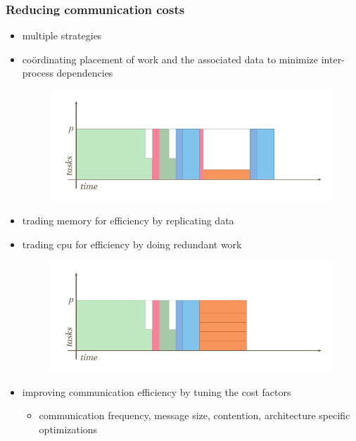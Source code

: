 \begin{frame}[fragile]
%
  \frametitle{Reducing communication costs}
%
  \begin{itemize}
%
  \item multiple strategies
%
  \item co\"ordinating placement of work and the associated data to minimize inter-process
    dependencies
    \begin{figure}
      \centering
      \includegraphics[scale=0.5]{figures/reduction-comsync-replication.pdf}
    \end{figure}
%
  \item trading memory for efficiency by replicating data
%
  \item trading cpu for efficiency by doing redundant work
    \begin{figure}
      \centering
      \includegraphics[scale=0.5]{figures/reduction-comsync-redundancy.pdf}
    \end{figure}
%
  \item improving communication efficiency by tuning the cost factors
    \begin{itemize}
    \item communication frequency, message size, contention, architecture specific
      optimizations
    \end{itemize}
%
  \end{itemize}
%
\end{frame}

